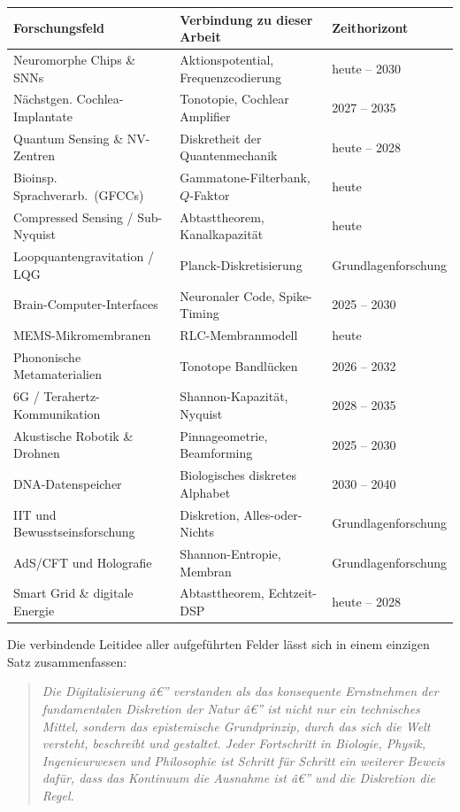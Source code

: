 ﻿\documentclass[12pt,a4paper,titlepage]{report}
\begin{document}
\begin{center}
\renewcommand{\arraystretch}{1.35}
\begin{tabular}{p{4.8cm} p{4.5cm} p{3.8cm}}
\toprule
\textbf{Forschungsfeld} & \textbf{Verbindung zu dieser Arbeit} & \textbf{Zeithorizont} \\
\midrule
Neuromorphe Chips \& SNNs & Aktionspotential, Frequenzcodierung & heute -- 2030 \\
Nächstgen. Cochlea-Implantate & Tonotopie, Cochlear Amplifier & 2027 -- 2035 \\
Quantum Sensing \& NV-Zentren & Diskretheit der Quantenmechanik & heute -- 2028 \\
Bioinsp. Sprachverarb.\ (GFCCs) & Gammatone-Filterbank, $Q$-Faktor & heute \\
Compressed Sensing / Sub-Nyquist & Abtasttheorem, Kanalkapazität & heute \\
Loopquantengravitation / LQG & Planck-Diskretisierung & Grundlagenforschung \\
Brain-Computer-Interfaces & Neuronaler Code, Spike-Timing & 2025 -- 2030 \\
MEMS-Mikromembranen & RLC-Membranmodell & heute \\
Phononische Metamaterialien & Tonotope Bandlücken & 2026 -- 2032 \\
6G / Terahertz-Kommunikation & Shannon-Kapazität, Nyquist & 2028 -- 2035 \\
Akustische Robotik \& Drohnen & Pinnageometrie, Beamforming & 2025 -- 2030 \\
DNA-Datenspeicher & Biologisches diskretes Alphabet & 2030 -- 2040 \\
IIT und Bewusstseinsforschung & Diskretion, Alles-oder-Nichts & Grundlagenforschung \\
AdS/CFT und Holografie & Shannon-Entropie, Membran & Grundlagenforschung \\
Smart Grid \& digitale Energie & Abtasttheorem, Echtzeit-DSP & heute -- 2028 \\
\bottomrule
\end{tabular}
\end{center}

\bigskip

Die verbindende Leitidee aller aufgeführten Felder lässt sich in einem
einzigen Satz zusammenfassen:

\begin{quote}
    \itshape
    Die Digitalisierung â€” verstanden als das konsequente Ernstnehmen der
    fundamentalen Diskretion der Natur â€” ist nicht nur ein technisches Mittel,
    sondern das epistemische Grundprinzip, durch das sich die Welt
    versteht, beschreibt und gestaltet. Jeder Fortschritt in Biologie,
    Physik, Ingenieurwesen und Philosophie ist Schritt für Schritt
    ein weiterer Beweis dafür, dass das Kontinuum die Ausnahme ist â€”
    und die Diskretion die Regel.
\end{quote}
\end{document}
